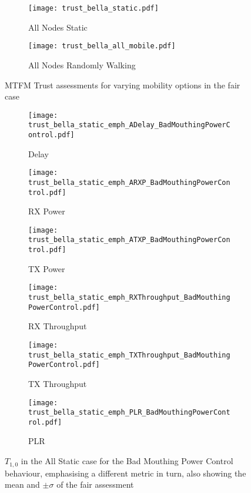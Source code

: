 \documentclass[runningheads,a4paper]{llncs}
\begin{document}
\begin{figure}
\begin{subfigure}{.5\textwidth}
  \centering
  \texttt{[image: trust\_bella\_static.pdf]}
  \caption{All Nodes Static}
  \label{fig:trust_static}
\end{subfigure}%
\begin{subfigure}{.5\textwidth}
\centering
  \texttt{[image: trust\_bella\_all\_mobile.pdf]}
  \caption{All Nodes Randomly Walking}
  \label{fig:trust_all_mobile}
\end{subfigure}
\caption{MTFM Trust assessments for varying mobility options in the fair case}
\label{fig:trust_mobility}
\end{figure}


\begin{figure}
\begin{subfigure}{0.32\textwidth}
  \centering
  \texttt{[image: trust\_bella\_static\_emph\_ADelay\_BadMouthingPowerControl.pdf]}
  \caption{Delay}
  \label{fig:static_badmouthing_delay}
\end{subfigure}
\begin{subfigure}{0.32\textwidth}
\centering
  \texttt{[image: trust\_bella\_static\_emph\_ARXP\_BadMouthingPowerControl.pdf]}
  \caption{RX Power}
  \label{fig:static_badmouthing_rxp}
\end{subfigure}
\begin{subfigure}{0.32\textwidth}
\centering
  \texttt{[image: trust\_bella\_static\_emph\_ATXP\_BadMouthingPowerControl.pdf]}
  \caption{TX Power}
  \label{fig:static_badmouthing_txp}
\end{subfigure}
\begin{subfigure}{0.32\textwidth}
\centering
  \texttt{[image: trust\_bella\_static\_emph\_RXThroughput\_BadMouthingPowerControl.pdf]}
  \caption{RX Throughput}
  \label{fig:static_badmouthing_rxthroughput}
\end{subfigure}
\begin{subfigure}{0.32\textwidth}
\centering
  \texttt{[image: trust\_bella\_static\_emph\_TXThroughput\_BadMouthingPowerControl.pdf]}
  \caption{TX Throughput}
  \label{fig:static_badmouthing_txthroughput}
\end{subfigure}
\begin{subfigure}{0.32\textwidth}
\centering
  \texttt{[image: trust\_bella\_static\_emph\_PLR\_BadMouthingPowerControl.pdf]}
  \caption{PLR}
  \label{fig:static_badmouthing_plr}
\end{subfigure}
\caption{$T_{1,0}$ in the All Static case for the Bad Mouthing Power Control behaviour, emphasising a different metric in turn, also showing the mean and $\pm \sigma$ of the fair assessment}
\label{fig:static_badmouthing}
\end{figure}
\end{document}
